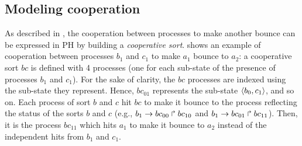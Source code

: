 \begin{comment}
This PH example actually models a BRN where the component $a$ has three qualitative
levels and components $b$ and $c$ are boolean.
In this BRN, $b$ and $c$ activate $a$, while $a$ inhibits $b$.
The inhibition of $b$ by $a$ is only effective when $a$ is at level $2$;
in the other cases, $b$ cannot evolve in any direction.
The activation of $a$ by $b$ ($c$) is encoded by the actions making the level of $a$ increase (resp.
decrease) when $b$ ($c$) is present (resp. absent).
It is worth noticing that the activation of $a$ by $b$ ($c$) is independent from $c$ ($b$).
This may express a lack of knowledge on the cooperation between these two regulators:
we thus model an over-approximation of the possible actions.
\end{example*}
\end{comment}

\subsection{Modeling cooperation}
As described in \cite{PMR10-TCSB}, the cooperation between processes to make another bounce can be
expressed in PH by building a \emph{cooperative sort}.
 shows an example of cooperation between processes $b_1$ and $c_1$ to
make $a_1$ bounce to $a_2$:
a cooperative sort $bc$ is defined with 4 processes (one for each sub-state of the presence of
processes $b_1$ and $c_1$).
For the sake of clarity, the $bc$ processes are indexed using the sub-state they represent.
Hence, $bc_{01}$ represents the sub-state $\mbox{$\langle b_0,c_1 \rangle$}$, and so on.
Each process of sort $b$ and $c$ hit $bc$ to make it bounce to the process reflecting the status of the sorts $b$
and $c$ (e.g., $b_1\rightarrow bc_{00}\Rsh bc_{10}$ and $b_1\rightarrow bc_{01}\Rsh bc_{11}$).
Then, it is the process $bc_{11}$ which hits $a_1$ to make it bounce to $a_2$ instead of the
independent hits from $b_1$ and $c_1$.



